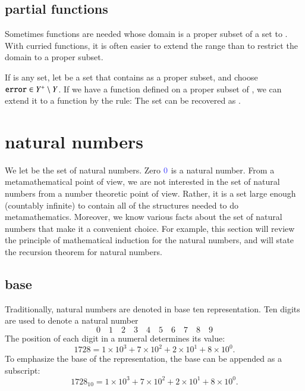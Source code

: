 \subsection{partial functions}

Sometimes functions are needed whose domain is a proper subset of a set  to .  With curried functions, it is often easier to extend the range than to restrict the domain to a proper subset.

If  is any set, let  be a set that contains  as a proper subset, and choose $\verb!error!\in Y^+\setminus Y$.  
If we have a function  defined on a proper subset  of , we can
extend it to a function  by the rule:
The set  can be recovered as
.








\section{natural numbers}

We let  be the set of natural numbers. 
Zero $\mc{0}$ is a natural number.  From a metamathematical point of view, we are not interested in the set of natural numbers from a number theoretic point of view.  Rather, it is a set large enough (countably infinite) to contain all of the structures needed to do metamathematics.  Moreover, we know various facts about the set of natural numbers that make it a convenient choice. For example, this section will review the principle of mathematical induction for the natural numbers, and will state the recursion theorem for natural numbers.


\subsection{base}

Traditionally, natural numbers are denoted in base ten representation.  Ten digits are used to denote a natural number
$$
0\quad 1\quad 2\quad 3\quad 4\quad 5\quad 6\quad 7\quad 8\quad 9
$$
The position of each digit in a numeral determines its value:
$$
1728 = 1\times 10^3 + 7\times 10^2 + 2\times 10^1 + 8\times 10^0.
$$
To emphasize the base of the representation, the base can be appended as a subscript:
$$1728_{10}=1\times 10^3 + 7\times 10^2 + 2\times 10^1 + 8\times 10^0.$$

